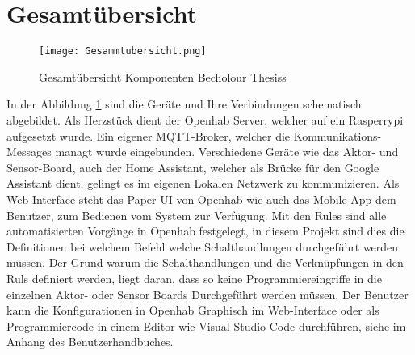 \section{Gesamtübersicht}
\begin{figure}[H]
\centering
\texttt{[image: Gesammtubersicht.png]}
\caption{Gesamtübersicht Komponenten Becholour Thesiss }
\label{pic: Gesamtübersicht}
\end{figure}
In der Abbildung \ref{pic: Gesamtübersicht} sind die Geräte und Ihre Verbindungen schematisch abgebildet. Als Herzstück dient der Openhab Server, welcher auf ein Rasperrypi aufgesetzt wurde. Ein eigener MQTT-Broker, welcher die Kommunikations-Messages managt wurde eingebunden. Verschiedene Geräte wie das Aktor- und Sensor-Board, auch der Home Assistant, welcher als Brücke für den Google Assistant dient, gelingt es im eigenen Lokalen Netzwerk zu kommunizieren. Als Web-Interface steht das Paper UI von Openhab wie auch das Mobile-App dem Benutzer, zum Bedienen vom System zur Verfügung. Mit den Rules sind alle automatisierten Vorgänge in Openhab festgelegt, in diesem Projekt sind dies die Definitionen bei welchem Befehl welche Schalthandlungen durchgeführt werden müssen. Der Grund warum die Schalthandlungen und die Verknüpfungen in den Ruls definiert werden, liegt daran, dass so keine Programmiereingriffe in die einzelnen Aktor- oder Sensor Boards Durchgeführt werden müssen. Der Benutzer kann die Konfigurationen in Openhab Graphisch im Web-Interface oder als Programmiercode in einem Editor wie Visual Studio Code durchführen, siehe im Anhang des Benutzerhandbuches.    




